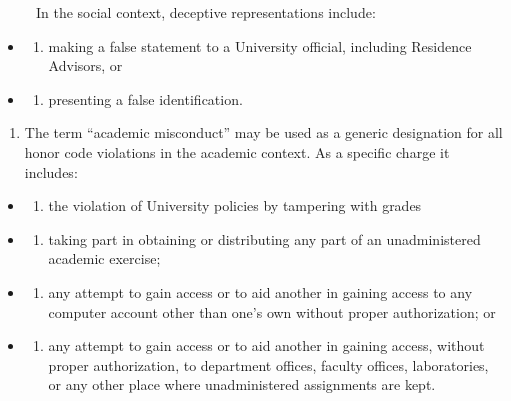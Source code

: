 ~~~~~In the social context, deceptive representations include:

\begin{itemize}
\item
  \begin{enumerate}
  \def\labelenumi{(\alph{enumi})}
  \tightlist
  \item
    making a false statement to a University official, including Residence Advisors, or
  \end{enumerate}
\item
  \begin{enumerate}
  \def\labelenumi{(\alph{enumi})}
  \setcounter{enumi}{1}
  \tightlist
  \item
    presenting a false identification.
  \end{enumerate}
\end{itemize}

\begin{enumerate}
\def\labelenumi{\arabic{enumi}.}
\setcounter{enumi}{4}
\tightlist
\item
  The term ``academic misconduct'' may be used as a generic designation for all honor code violations in the academic context. As a specific charge it includes:
\end{enumerate}

\begin{itemize}
\item
  \begin{enumerate}
  \def\labelenumi{(\alph{enumi})}
  \tightlist
  \item
    the violation of University policies by tampering with grades
  \end{enumerate}
\item
  \begin{enumerate}
  \def\labelenumi{(\alph{enumi})}
  \setcounter{enumi}{1}
  \tightlist
  \item
    taking part in obtaining or distributing any part of an unadministered academic exercise;
  \end{enumerate}
\item
  \begin{enumerate}
  \def\labelenumi{(\alph{enumi})}
  \setcounter{enumi}{2}
  \tightlist
  \item
    any attempt to gain access or to aid another in gaining access to any computer account other than one's own without proper authorization; or
  \end{enumerate}
\item
  \begin{enumerate}
  \def\labelenumi{(\alph{enumi})}
  \setcounter{enumi}{3}
  \tightlist
  \item
    any attempt to gain access or to aid another in gaining access, without proper authorization, to department offices, faculty offices, laboratories, or any other place where unadministered assignments are kept.
  \end{enumerate}
\end{itemize}

